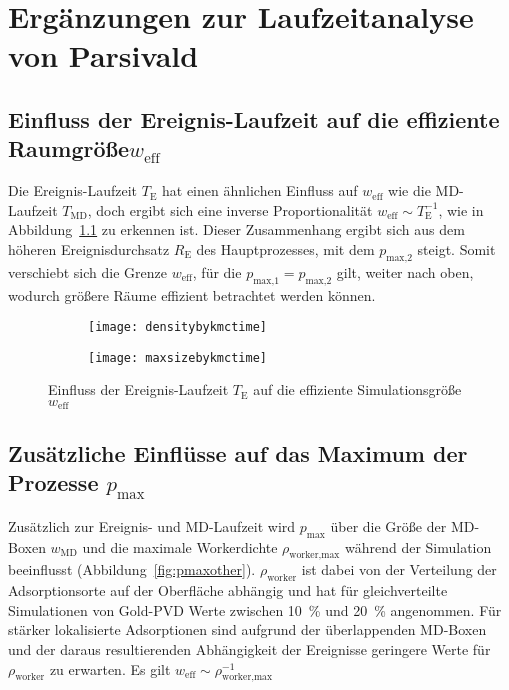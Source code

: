 \chapter{Ergänzungen zur Laufzeitanalyse von Parsivald}
\label{appendix_runtime}

\section{Einfluss der Ereignis-Laufzeit auf die effiziente Raumgröße\texorpdfstring{$w_\text{eff}$}{weff}}

Die Ereignis-Laufzeit $T_\text{E}$ hat einen ähnlichen Einfluss auf $w_\text{eff}$ wie die MD-Laufzeit $T_\text{MD}$, doch ergibt sich eine inverse Proportionalität $w_\text{eff} \sim T_\text{E}^{-1}$, wie in Abbildung~\ref{fig:weffeventtime} zu erkennen ist.
Dieser Zusammenhang ergibt sich aus dem höheren Ereignisdurchsatz $R_\text{E}$ des Hauptprozesses, mit dem $p_\text{max,2}$ steigt.
Somit verschiebt sich die Grenze $w_\text{eff}$, für die $p_\text{max,1} = p_\text{max,2}$ gilt, weiter nach oben, wodurch größere Räume effizient betrachtet werden können.

\begin{figure}[p]

  \captionsetup[subfigure]{singlelinecheck=false}
  \def\subfigwidth{7cm}
  \begin{subfigure}[t]{\subfigwidth}
    \texttt{[image: densitybykmctime]}
  \end{subfigure}
  \hfill
  \begin{subfigure}[t]{\subfigwidth}
    \texttt{[image: maxsizebykmctime]}
  \end{subfigure}

  \caption{Einfluss der Ereignis-Laufzeit $T_\text{E}$ auf die effiziente Simulationsgröße $w_\text{eff}$}
  \label{fig:weffeventtime}

\end{figure}

\section{Zusätzliche Einflüsse auf das Maximum der Prozesse \texorpdfstring{$p_\text{max}$}{pmax}}

Zusätzlich zur Ereignis- und MD-Laufzeit wird $p_\text{max}$ über die Größe der MD-Boxen $w_\text{MD}$ und die maximale Workerdichte $\rho_\text{worker,max}$ während der Simulation beeinflusst (Abbildung~\ref{fig:pmaxother}).
$\rho_\text{worker}$ ist dabei von der Verteilung der Adsorptionsorte auf der Oberfläche abhängig und hat für gleichverteilte Simulationen von Gold-PVD Werte zwischen \SI{10}{\percent} und \SI{20}{\percent} angenommen.
Für stärker lokalisierte Adsorptionen sind aufgrund der überlappenden MD-Boxen und der daraus resultierenden Abhängigkeit der Ereignisse geringere Werte für $\rho_\text{worker}$ zu erwarten.
Es gilt $w_\text{eff} \sim \rho_\text{worker,max}^{-1}$

